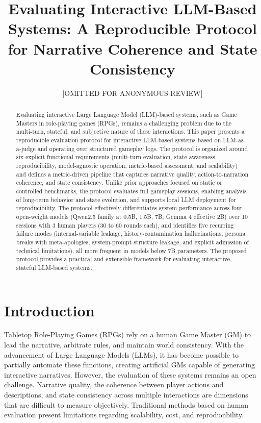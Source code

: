 \documentclass[12pt]{article}
\title{Evaluating Interactive LLM-Based Systems: A Reproducible Protocol for Narrative Coherence and State Consistency}
\author{[OMITTED FOR ANONYMOUS REVIEW]}
\begin{document}
\maketitle

\thispagestyle{plain}

\begin{abstract}
Evaluating interactive Large Language Model (LLM)-based systems, such as Game Masters in role-playing games (RPGs), remains a challenging problem due to the multi-turn, stateful, and subjective nature of these interactions. This paper presents a reproducible evaluation protocol for interactive LLM-based systems based on LLM-as-a-judge and operating over structured gameplay logs. The protocol is organized around six explicit functional requirements (multi-turn evaluation, state awareness, reproducibility, model-agnostic operation, metric-based assessment, and scalability) and defines a metric-driven pipeline that captures narrative quality, action-to-narration coherence, and state consistency. Unlike prior approaches focused on static or controlled benchmarks, the protocol evaluates full gameplay sessions, enabling analysis of long-term behavior and state evolution, and supports local LLM deployment for reproducibility. The protocol effectively differentiates system performance across four open-weight models (Qwen2.5 family at 0.5B, 1.5B, 7B; Gemma 4 effective 2B) over 10 sessions with 3 human players (30 to 60 rounds each), and identifies five recurring failure modes (internal-variable leakage, history-contamination hallucinations, persona breaks with meta-apologies, system-prompt structure leakage, and explicit admission of technical limitations), all more frequent in models below 7B parameters. The proposed protocol provides a practical and extensible framework for evaluating interactive, stateful LLM-based systems.
\end{abstract}


\section{Introduction}

Tabletop Role-Playing Games (RPGs) rely on a human Game Master (GM) to lead the narrative, arbitrate rules, and maintain world consistency. With the advancement of Large Language Models (LLMs), it has become possible to partially automate these functions, creating artificial GMs capable of generating interactive narratives. However, the evaluation of these systems remains an open challenge. Narrative quality, the coherence between player actions and descriptions, and state consistency across multiple interactions are dimensions that are difficult to measure objectively. Traditional methods based on human evaluation present limitations regarding scalability, cost, and reproducibility.
\end{document}
